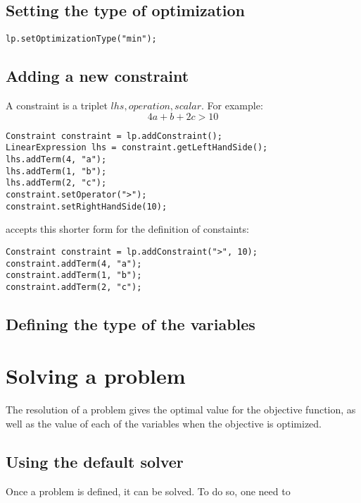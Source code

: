 \documentclass{article}
\begin{document}
\subsection{Setting the type of optimization}

\begin{lstlisting}
lp.setOptimizationType("min");
\end{lstlisting}


\subsection{Adding a new constraint}

A constraint is a triplet $lhs, operation, scalar$. For example:
$$
	4a + b + 2c > 10
$$



\begin{lstlisting}
Constraint constraint = lp.addConstraint();
LinearExpression lhs = constraint.getLeftHandSide();
lhs.addTerm(4, "a");
lhs.addTerm(1, "b");
lhs.addTerm(2, "c");
constraint.setOperator(">");
constraint.setRightHandSide(10);
\end{lstlisting}

 \jalinopt accepts this shorter form for the definition of constaints:



\begin{lstlisting}
Constraint constraint = lp.addConstraint(">", 10);
constraint.addTerm(4, "a");
constraint.addTerm(1, "b");
constraint.addTerm(2, "c");
\end{lstlisting}


\subsection{Defining the type of the variables}


\section{Solving a problem}


The resolution of a problem gives the optimal value for the objective function, as well as the value of each of the variables
when the objective is optimized.


\subsection{Using the default solver}


Once a problem is defined, it can be solved. To do so, one need to 
\end{document}
